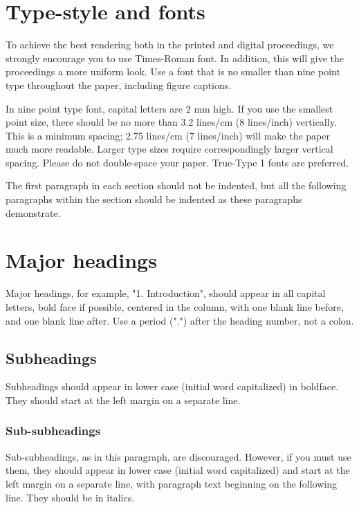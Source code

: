 \documentclass{article}
\begin{document}
\section{Type-style and fonts}
\label{sec:typestyle}

To achieve the best rendering both in the printed and digital proceedings, we
strongly encourage you to use Times-Roman font.  In addition, this will give
the proceedings a more uniform look.  Use a font that is no smaller than nine
point type throughout the paper, including figure captions.

In nine point type font, capital letters are 2 mm high.  If you use the
smallest point size, there should be no more than 3.2 lines/cm (8 lines/inch)
vertically.  This is a minimum spacing; 2.75 lines/cm (7 lines/inch) will make
the paper much more readable.  Larger type sizes require correspondingly larger
vertical spacing.  Please do not double-space your paper.  True-Type 1 fonts
are preferred.

The first paragraph in each section should not be indented, but all the
following paragraphs within the section should be indented as these paragraphs
demonstrate.

\section{Major headings}
\label{sec:majhead}

Major headings, for example, "1. Introduction", should appear in all capital
letters, bold face if possible, centered in the column, with one blank line
before, and one blank line after. Use a period (".") after the heading number,
not a colon.

\subsection{Subheadings}
\label{ssec:subhead}

Subheadings should appear in lower case (initial word capitalized) in
boldface.  They should start at the left margin on a separate line.
 
\subsubsection{Sub-subheadings}
\label{sssec:subsubhead}

Sub-subheadings, as in this paragraph, are discouraged. However, if you
must use them, they should appear in lower case (initial word
capitalized) and start at the left margin on a separate line, with paragraph
text beginning on the following line.  They should be in italics.
\end{document}
